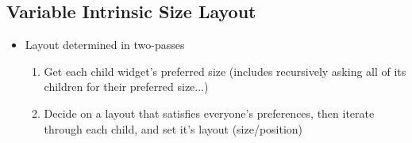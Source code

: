 \documentclass[twoside]{article}
\begin{document}
\subsection{Variable Intrinsic Size Layout}
\begin{itemize}
\item Layout determined in two-passes 
\begin{enumerate}
\item Get each child widget’s preferred size (includes recursively
asking all of its children for their preferred size...)
\item Decide on a layout that satisfies everyone’s preferences, then iterate through each child, and set it’s layout (size/position)
\end{enumerate}
\end{itemize}
\end{document}
